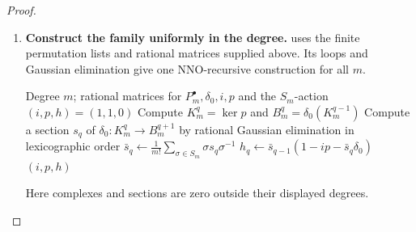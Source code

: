 \documentclass[11pt,a4paper]{article}
\numberwithin{algorithm}{section}
\numberwithin{equation}{section}
\theoremstyle{definition}
\theoremstyle{remark}
\theoremstyle{plain}
\theoremstyle{definition}
\theoremstyle{plain}
\begin{document}
\begin{proof}
\begin{enumerate}[leftmargin=*,align=left]
\item \textbf{Construct the family uniformly in the degree.}
 uses the finite permutation
lists and rational matrices supplied above. Its loops and Gaussian
elimination give one NNO-recursive construction for all $m$.
\begin{algorithm}[H]
\caption{Equivariant contraction of the finite permutation complex}\label{alg:homogeneous-contraction}
\small
\begin{algorithmic}[1]
\Require Degree $m$; rational matrices for $P_m^\bullet,\delta_0,i,p$ and the $S_m$-action
  \State \Return $(i,p,h)=(1,1,0)$
\EndIf
{}
  \State Compute $K_m^q=\ker p$ and $B_m^q=\delta_0(K_m^{q-1})$
\EndFor
{}
  \State Compute a section $s_q$ of $\delta_0:K_m^q\to B_m^{q+1}$
  \Statex \hspace{\algorithmicindent}by rational Gaussian elimination in lexicographic order
  \State $\bar s_q\gets\frac1{m!}\sum_{\sigma\in S_m}\sigma s_q\sigma^{-1}$
\EndFor
{}
  \State $h_q\gets\bar s_{q-1}(1-ip-\bar s_q\delta_0)$
\EndFor
\State \Return $(i,p,h)$
\end{algorithmic}
\end{algorithm}
Here complexes and sections are zero outside their displayed degrees.
\end{enumerate}
\end{proof}
\end{document}
